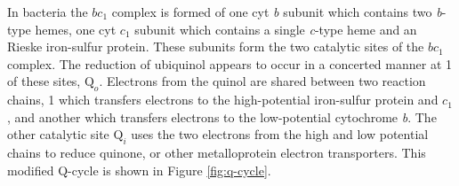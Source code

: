 In bacteria the $bc_1$ complex is formed of one cyt \textit{b} subunit which contains two \textit{b}-type hemes, one cyt $c_1$ subunit which contains a single \textit{c}-type heme and an Rieske iron-sulfur protein. These subunits form the two catalytic sites of the $bc_1$ complex. The reduction of ubiquinol appears to occur in a concerted manner at 1 of these sites, $\mathrm{Q}_o$\cite{Darrouzet1999}. Electrons from the quinol are shared between two reaction chains, 1 which transfers electrons to the high-potential iron-sulfur protein and $c_1$, and another which transfers electrons to the low-potential cytochrome \textit{b}. The other catalytic site $\mathrm{Q}_i$ uses the two electrons from the high and low potential chains to reduce quinone, or other metalloprotein electron transporters\cite{Snyder2000,Berry2011}. This modified Q-cycle is shown in Figure \ref{fig:q-cycle}.

